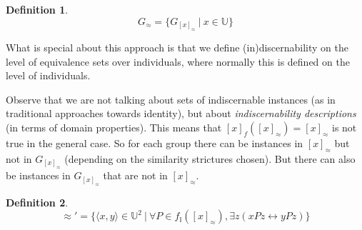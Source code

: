\documentclass[11pt,a4paper,notitlepage,onecolumn,twoside]{article}
\newtheorem{definition}{Definition}
\begin{document}
\begin{definition}
\begin{equation}
G_{\approx} = \{ G_{[x]_{\approx}} \  \vert \  x \in \mathbb{U} \}
\end{equation}
\end{definition}

What is special about this approach is that we define (in)discernability on
the level of equivalence sets over individuals,
where normally this is defined on the level of individuals.

Observe that we are not talking about sets of indiscernable instances
(as in traditional approaches towards identity),
but about \emph{indiscernability descriptions}
(in terms of domain properties).
This means that $[x]_f([x]_{\approx}) = [x]_{\approx}$ is not true in the
general case. So for each group there can be instances in $[x]_{\approx}$
but not in $G_{[x]_{\approx}}$
(depending on the similarity strictures chosen).
But there can also be instances in $G_{[x]_{\approx}}$ that are not in
$[x]_{\approx}$.

\begin{definition}
\begin{equation}
\approx' = \{ \langle x, y \rangle \in \mathbb{U}^2 \  \vert \ 
    \forall P \in f_{\mathbb{I}}([x]_{\approx}), \exists z (xPz \leftrightarrow yPz) \}
\end{equation}
\end{definition}
\end{document}
